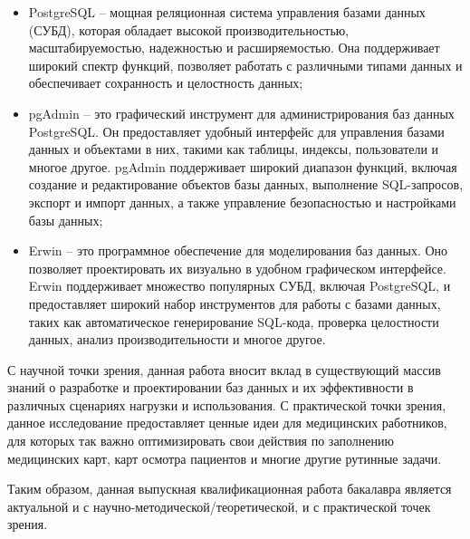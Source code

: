 \begin{itemize}
    \item PostgreSQL – мощная реляционная система управления базами данных (СУБД), которая обладает высокой производительностью, масштабируемостью, надежностью и расширяемостью. Она поддерживает широкий спектр функций, позволяет работать с различными типами данных и обеспечивает сохранность и целостность данных;
    \item pgAdmin – это графический инструмент для администрирования баз данных PostgreSQL. Он предоставляет удобный интерфейс для управления базами данных и объектами в них, такими как таблицы, индексы, пользователи и многое другое. pgAdmin поддерживает широкий диапазон функций, включая создание и редактирование объектов базы данных, выполнение SQL-запросов, экспорт и импорт данных, а также управление безопасностью и настройками базы данных;
    \item Erwin – это программное обеспечение для моделирования баз данных. Оно позволяет проектировать их визуально в удобном графическом интерфейсе. Erwin поддерживает множество популярных СУБД, включая PostgreSQL, и предоставляет широкий набор инструментов для работы с базами данных, таких как автоматическое генерирование SQL-кода, проверка целостности данных, анализ производительности и многое другое.
\end{itemize}

С научной точки зрения, данная работа вносит вклад в существующий массив знаний о разработке и проектировании баз данных и их эффективности в различных сценариях нагрузки и использования. С практической точки зрения, данное исследование предоставляет ценные идеи для медицинских работников, для которых так важно оптимизировать свои действия по заполнению медицинских карт, карт осмотра пациентов и многие другие рутинные задачи.

Таким образом, данная выпускная квалификационная работа бакалавра является актуальной и с научно-методической/теоретической, и с практической точек зрения.